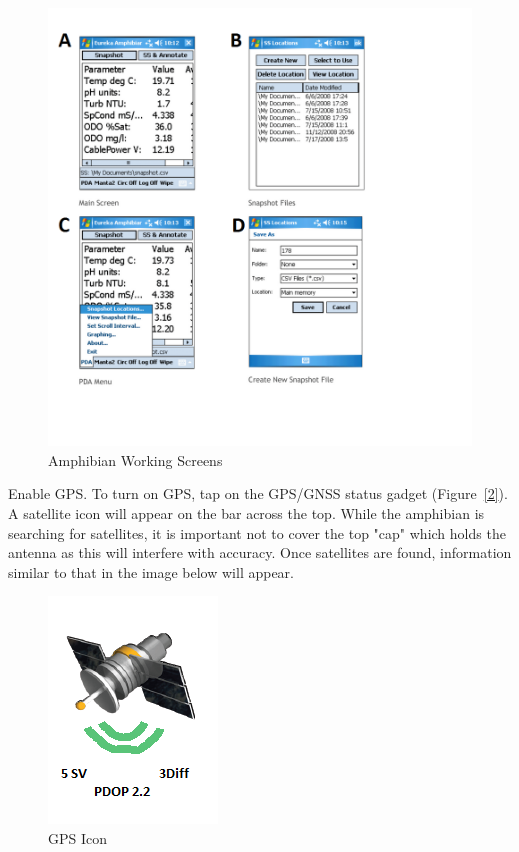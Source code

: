 \documentclass[12pt]{../SOP3_beta}\usepackage[]{graphicx}\usepackage[]{color}
\begin{document}
\begin{figure}[h]
\centering
\includegraphics[scale=0.6]{AmphibianMain.png}
\caption{Amphibian Working Screens}
\label{fig:AmphibianMain.png}
\end{figure}

\NP Enable GPS. To turn on GPS, tap on the GPS/GNSS status gadget (Figure~\ref{2}). A satellite icon will appear on the bar across the top. While the amphibian is searching for satellites, it is important not to cover the top "cap" which holds the antenna as this will interfere with accuracy. Once satellites are found, information similar to that in the image below will appear.

\begin{figure}[h]
\centering
\includegraphics{GPS.png}
\caption{GPS Icon}
\label{GPS.png}
\end{figure}
\end{document}
